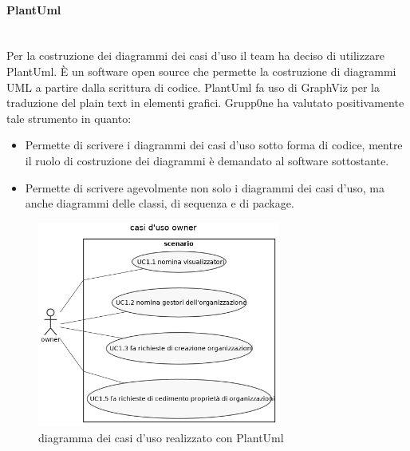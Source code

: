 \documentclass[../norme-di-progetto.tex]{subfiles}
\begin{document}
\paragraph{PlantUml}%
\label{par:plantuml}
\\ Per la costruzione dei diagrammi dei casi d'uso il team ha deciso di utilizzare PlantUml. È un software open source che permette la costruzione di diagrammi UML a partire dalla scrittura di codice. PlantUml fa uso di GraphViz per la traduzione del plain text in elementi grafici. Grupp0ne ha valutato positivamente tale strumento in quanto:

\begin{itemize}
  \item Permette di scrivere i diagrammi dei casi d'uso sotto forma di codice, mentre il ruolo di costruzione dei diagrammi è demandato al software sottostante.
  \item Permette di scrivere agevolmente non solo i diagrammi dei casi d'uso, ma anche diagrammi delle classi, di sequenza e di package.
\end{itemize}

\begin{figure}[H]
  \includegraphics[width=8cm]{components/img/owner_use_cases.png}
  \centering
  \caption{diagramma dei casi d'uso realizzato con PlantUml}
\end{figure}
\end{document}
